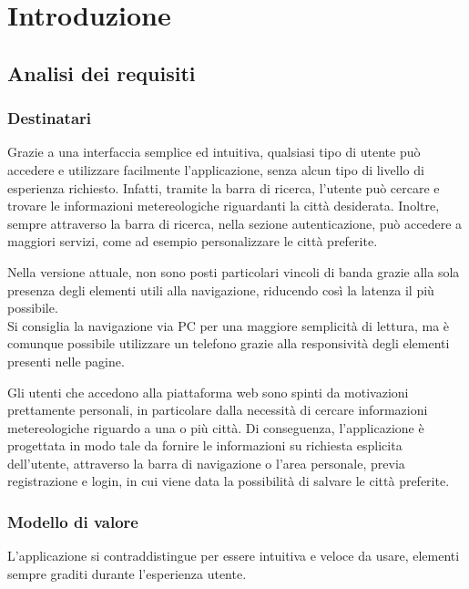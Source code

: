 \chapter{Introduzione}

\section{Analisi dei requisiti}

\subsection{Destinatari}

Grazie a una interfaccia semplice ed intuitiva, qualsiasi tipo di utente può accedere e utilizzare facilmente l'applicazione, senza alcun tipo di livello di esperienza richiesto.
Infatti, tramite la barra di ricerca, l'utente può cercare e trovare le informazioni metereologiche riguardanti la città desiderata.
Inoltre, sempre attraverso la barra di ricerca, nella sezione autenticazione, può accedere a maggiori servizi, come ad esempio personalizzare le città preferite.

\vspace{5mm}

Nella versione attuale, non sono posti particolari vincoli di banda grazie alla sola presenza degli elementi utili alla
navigazione, riducendo così la latenza il più possibile.\\
Si consiglia la navigazione via PC per una maggiore semplicità di lettura, ma è comunque possibile utilizzare un
telefono grazie alla responsività degli elementi presenti nelle pagine.

\vspace{5mm}

Gli utenti che accedono alla piattaforma web sono spinti da motivazioni prettamente personali, in particolare dalla necessità di cercare informazioni metereologiche riguardo a una o più città.
Di conseguenza, l'applicazione è progettata in modo tale da fornire le informazioni su richiesta esplicita dell'utente, attraverso la barra di navigazione o l'area personale, previa registrazione e login, in cui viene data la
possibilità di salvare le città preferite.

\subsection{Modello di valore}

L'applicazione si contraddistingue per essere intuitiva e veloce da usare, elementi sempre graditi durante l'esperienza utente.

